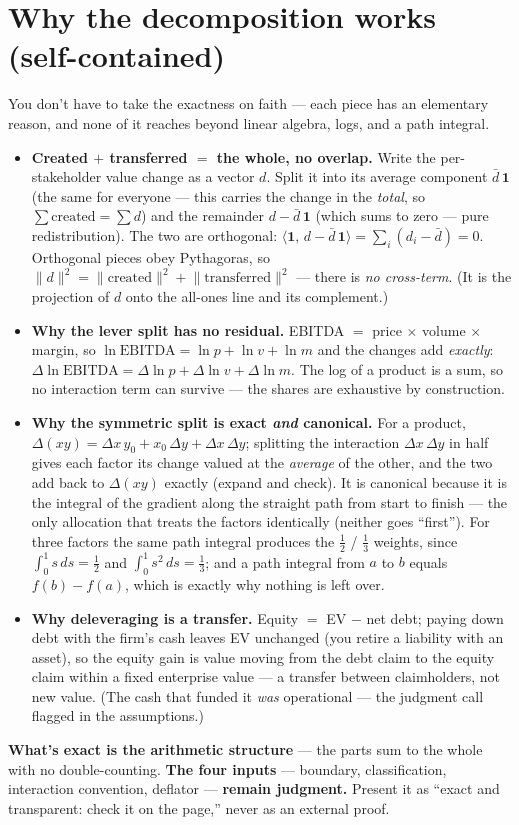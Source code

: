 \documentclass[11pt]{article}
\begin{document}
\section{Why the decomposition works (self-contained)}
You don't have to take the exactness on faith --- each piece has an elementary reason, and none
of it reaches beyond linear algebra, logs, and a path integral.
\begin{itemize}
  \item \textbf{Created $+$ transferred $=$ the whole, no overlap.} Write the per-stakeholder
  value change as a vector $d$. Split it into its average component $\bar d\,\mathbf{1}$ (the same
  for everyone --- this carries the change in the \emph{total}, so $\sum\text{created}=\sum d$) and
  the remainder $d-\bar d\,\mathbf{1}$ (which sums to zero --- pure redistribution). The two are
  orthogonal: $\langle \mathbf{1},\, d-\bar d\,\mathbf{1}\rangle=\sum_i (d_i-\bar d)=0$. Orthogonal
  pieces obey Pythagoras, so $\lVert d\rVert^2=\lVert\text{created}\rVert^2+\lVert\text{transferred}\rVert^2$
  --- there is \emph{no cross-term}. (It is the projection of $d$ onto the all-ones line and its
  complement.)
  \item \textbf{Why the lever split has no residual.} EBITDA $=$ price $\times$ volume $\times$
  margin, so $\ln\text{EBITDA}=\ln p+\ln v+\ln m$ and the changes add \emph{exactly}:
  $\Delta\ln\text{EBITDA}=\Delta\ln p+\Delta\ln v+\Delta\ln m$. The log of a product is a sum, so
  no interaction term can survive --- the shares are exhaustive by construction.
  \item \textbf{Why the symmetric split is exact \emph{and} canonical.} For a product,
  $\Delta(xy)=\Delta x\,y_0+x_0\,\Delta y+\Delta x\,\Delta y$; splitting the interaction
  $\Delta x\,\Delta y$ in half gives each factor its change valued at the \emph{average} of the
  other, and the two add back to $\Delta(xy)$ exactly (expand and check). It is canonical because
  it is the integral of the gradient along the straight path from start to finish --- the only
  allocation that treats the factors identically (neither goes ``first''). For three factors the
  same path integral produces the $\tfrac12$ / $\tfrac13$ weights, since $\int_0^1 s\,ds=\tfrac12$
  and $\int_0^1 s^2\,ds=\tfrac13$; and a path integral from $a$ to $b$ equals $f(b)-f(a)$, which is
  exactly why nothing is left over.
  \item \textbf{Why deleveraging is a transfer.} Equity $=$ EV $-$ net debt; paying down debt with
  the firm's cash leaves EV unchanged (you retire a liability with an asset), so the equity gain is
  value moving from the debt claim to the equity claim within a fixed enterprise value --- a
  transfer between claimholders, not new value. (The cash that funded it \emph{was} operational ---
  the judgment call flagged in the assumptions.)
\end{itemize}
\textbf{What's exact is the arithmetic structure} --- the parts sum to the whole with no
double-counting. \textbf{The four inputs} --- boundary, classification, interaction convention,
deflator --- \textbf{remain judgment.} Present it as ``exact and transparent: check it on the
page,'' never as an external proof.
\end{document}

